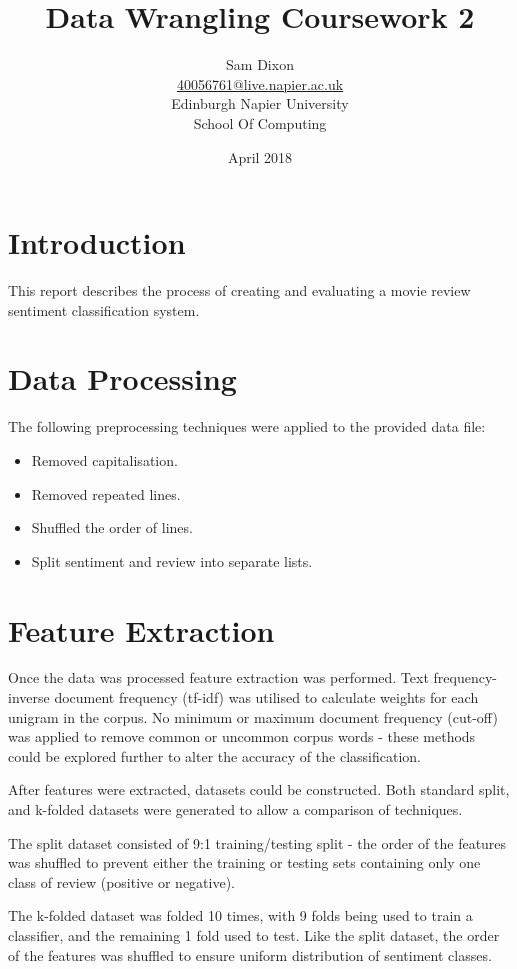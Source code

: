 \documentclass[twocolumn]{article}
\title{Data Wrangling Coursework 2}
\author{Sam Dixon
    \\\href{mailto:40056761@live.napier.ac.uk}{40056761@live.napier.ac.uk}
    \\Edinburgh Napier University
    \\School Of Computing
    \\}
\date{April 2018}
\begin{document}
\maketitle


\section{Introduction}
This report describes the process of creating and evaluating a movie review
sentiment classification system.


\section{Data Processing}
The following preprocessing techniques were applied to the provided data file:
\begin{itemize}
    \item Removed capitalisation.
    \item Removed repeated lines.
    \item Shuffled the order of lines.
    \item Split sentiment and review into separate lists.
\end{itemize}


\section{Feature Extraction}
Once the data was processed feature extraction was performed.
Text frequency-inverse document frequency (tf-idf) was utilised to calculate
weights for each unigram in the corpus.
No minimum or maximum document frequency (cut-off) was applied to remove
common or uncommon corpus words - these methods could be explored further to
alter the accuracy of the classification.

After features were extracted, datasets could be constructed.
Both standard split, and k-folded datasets were generated to allow a
comparison of techniques.

The split dataset consisted of 9:1 training/testing split - the order of the
features was shuffled to prevent either the training or testing sets containing
only one class of review (positive or negative).

The k-folded dataset was folded 10 times, with 9 folds being used to train a
classifier, and the remaining 1 fold used to test.
Like the split dataset, the order of the features was shuffled to ensure
uniform distribution of sentiment classes.
\end{document}
